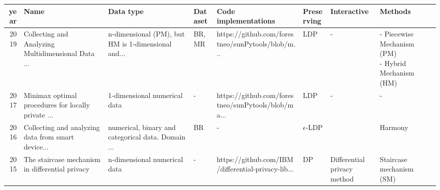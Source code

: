 \begin{landscape}
\begin{table}[ht]
    \begin{tabular}{rllllllll}
      \toprule
      year                                & Name                                               & Data type                                          & Dataset & Code implementations                               & Preserving     & Interactive                 & Methods                                \\
      \midrule
      2019 \citep{wang_collecting_2019}   & Collecting and Analyzing Multidimensional Data ... & n-dimensional (PM), but HM is 1-dimensional and... & BR, MR  & https://github.com/forestneo/sunPytools/blob/m...  & LDP            & -                           & \shortstack{- Piecewise Mechanism (PM) \\- Hybrid Mechanism (HM)}                         \\
      2017 \citep{duchi_minimax_2017}     & Minimax optimal procedures for locally private ... & 1-dimensional numerical data                       & -       & https://github.com/forestneo/sunPytools/blob/ma... & LDP            & -                           & -                                      \\
      2016 \citep{nguyen_collecting_2016} & Collecting and analyzing data from smart device... & numerical, binary and categorical data. Domain ... & BR      & -                                                  & $\epsilon$-LDP &                             & Harmony                                \\
      2015 \citep{geng_staircase_2015}    & The staircase mechanism in differential privacy    & n-dimensional numerical data                       & -       & https://github.com/IBM/differential-privacy-lib... & DP             & Differential privacy method & Staircase mechanism (SM)               \\

\end{tabular}
\end{table}
\end{landscape}
